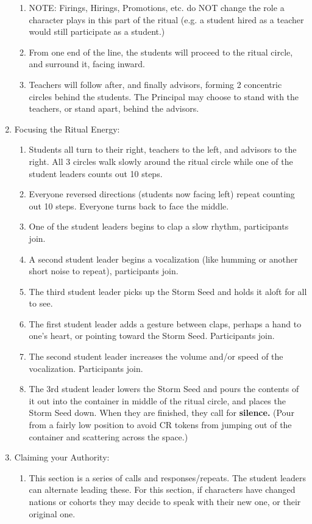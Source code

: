 \documentclass[green]{GL2020}
\begin{document}
\begin{enumerate}
\begin{enumerate}
\item NOTE: Firings, Hirings, Promotions, etc. do NOT change the role a character plays in this part of the ritual (e.g. a student hired as a teacher would still participate as a student.)
\item From one end of the line, the students will proceed to the ritual circle, and surround it, facing inward.
\item Teachers will follow after, and finally advisors, forming 2 concentric circles behind the students. The Principal may choose to stand with the teachers, or stand apart, behind the advisors.
\end{enumerate}
\item Focusing the Ritual Energy:
\begin{enumerate}
\item Students all turn to their right, teachers to the left, and advisors to the right. All 3 circles walk slowly around the ritual circle while one of the student leaders counts out 10 steps. 
\item Everyone reversed directions (students now facing left) repeat counting out 10 steps. Everyone turns back to face the middle.
\item One of the student leaders begins to clap a slow rhythm, participants join.
\item A second student leader begins a vocalization (like humming or another short noise to repeat), participants join.
\item The third student leader picks up the Storm Seed and holds it aloft for all to see.
\item The first student leader adds a gesture between claps, perhaps a hand to one’s heart, or pointing toward the Storm Seed. Participants join.
\item The second student leader increases the volume and/or speed of the vocalization. Participants join.
\item The 3rd student leader lowers the Storm Seed and pours the contents of it out into the container in middle of the ritual circle, and places the Storm Seed down. When they are finished, they call for \textbf{silence.} (Pour from a fairly low position to avoid CR tokens from jumping out of the container and scattering across the space.)
\end{enumerate}
\item Claiming your Authority:
\begin{enumerate}
\item This section is a series of calls and responses/repeats. The student leaders can alternate leading these. For this section, if characters have changed nations or cohorts they may decide to speak with their new one, or their original one.

\end{enumerate}
\end{enumerate}
\end{document}
